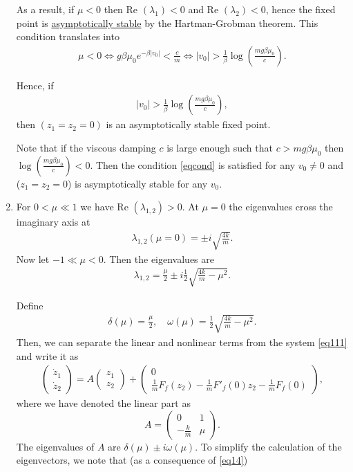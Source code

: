 \begin{solution}[4.4]
\begin{enumerate}
As a result, if $\mu<0$ then Re $(\lambda_1)<0$ and Re $(\lambda_2)<0$, hence the fixed point is \underline{asymptotically stable} by the Hartman-Grobman theorem. This condition translates into
\begin{align}
\mu<0 \Leftrightarrow g\beta\mu_0e^{-\beta|v_0|}<\frac{c}{m} \Leftrightarrow |v_0| > \frac{1}{\beta}\log\left(\frac{mg\beta \mu_0}{c} \right).
\end{align}

Hence, if 
\begin{align}
\label{eqcond}
|v_0| > \frac{1}{\beta}\log\left(\frac{mg\beta \mu_0}{c} \right),
\end{align}
then $(z_1=z_2=0)$ is an asymptotically stable fixed point. 

\begin{remark}[]
Note that if the viscous damping $c$ is large enough such that $c>mg\beta \mu_0$ then $\log\left(\frac{mg\beta \mu_0}{c} \right)<0$. Then the condition \eqref{eqcond} is satisfied for any $v_0\neq 0$ and ($z_1=z_2=0$) is asymptotically stable for any $v_0$.
\end{remark}

\item For $0<\mu \ll 1$ we have Re $(\lambda_{1,2})>0$. At $\mu=0$ the eigenvalues cross the imaginary axis at 
	\begin{align}
\lambda_{1,2}(\mu=0)=\pm i \sqrt{\frac{4k}{m}}.
	\end{align}
Now let $-1\ll\mu< 0$. Then the eigenvalues are 
\begin{align}
\lambda_{1,2}=\frac{\mu}{2}\pm i\frac{1}{2} \sqrt{\frac{4k}{m}-\mu^2}.
\end{align}

Define 
\begin{align}
\label{eq14}
\boxed{\delta(\mu)=\frac{\mu}{2}, \quad \omega(\mu)=\frac{1}{2}\sqrt{\frac{4k}{m}-\mu^2}.}
\end{align}
Then, we can separate the linear and nonlinear terms from the system \eqref{eq111} and write it as
\begin{align}
\label{transf}
\begin{pmatrix} \dot{z}_1 \\ \dot{z}_2 \end{pmatrix} = A\begin{pmatrix} z_1 \\ z_2 \end{pmatrix} + \begin{pmatrix} 0 \\ \frac{1}{m}F_f(z_2)-\frac{1}{m}F'_f(0)z_2 - \frac{1}{m}F_f(0)\end{pmatrix},
\end{align}
where we have denoted the linear part as $$A=\begin{pmatrix} 0 & 1 \\ -\frac{k}{m} & \mu \end{pmatrix}.$$ The eigenvalues of $A$ are $\delta(\mu)\pm i \omega(\mu)$. To simplify the calculation of the eigenvectors, we note that  (as a consequence of \eqref{eq14})


\end{enumerate}
\end{solution}
